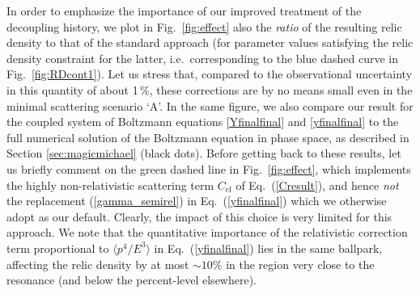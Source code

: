 \documentclass[twocolumn,showpacs,amsmath,amssymb,superscriptaddress,nofootinbib]{revtex4-1}
\begin{document}
In order to emphasize  the importance of our improved treatment of the decoupling history, 
we plot in Fig.~\ref{fig:effect} also the {\it ratio} of the resulting relic density to that of the
standard approach (for parameter values satisfying the relic density constraint for the latter, 
i.e.~corresponding to the  blue dashed curve in Fig.~\ref{fig:RDcont1}). Let us stress that, 
compared to the observational uncertainty in this quantity of about 1\,\%, these corrections
are by no means small even in the minimal scattering scenario `A'. In the same figure, we 
also compare our result for the coupled 
system of Boltzmann equations \eqref{Yfinalfinal} and \eqref{yfinalfinal} to the full 
numerical solution of the Boltzmann equation in phase space, as described in
Section \ref{sec:magicmichael} (black dots). Before getting back to these results,
let us briefly comment on the green dashed line in Fig.~\ref{fig:effect}, which implements 
the highly non-relativistic scattering term $C_{\text{el}}$ of Eq.~(\ref{Cresult}), and hence {\it not} the 
replacement (\ref{gamma_semirel}) in Eq.~(\ref{yfinalfinal}) which we otherwise adopt
as our default. Clearly, the impact of this choice is very limited for this approach. 
We note that the quantitative importance of the relativistic correction term proportional to 
$\langle p^4/E^3\rangle$ in Eq.~(\ref{yfinalfinal}) lies in the same ballpark, affecting the
relic density by at most $\sim$$10\%$ in the region very close to the resonance
(and below the percent-level elsewhere).
\end{document}
